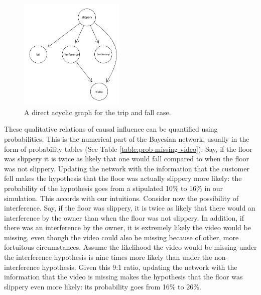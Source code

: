 \documentclass[
  10pt,
  dvipsnames,enabledeprecatedfontcommands]{scrartcl}
\begin{document}
\begin{figure}[t]
\includegraphics[width=5cm]{slippery-dag.png}
\caption{A direct acyclic graph for the trip and fall case.}
\label{fig:dag-missing-video}
\end{figure}

These qualitative relations of causal influence can be quantified using
probabilities. This is the numerical part of the Bayesian network,
usually in the form of probability tables (See Table
\ref{table:prob-missing-video}). Say, if the floor was slippery it is
twice as likely that one would fall compared to when the floor was not
slippery. Updating the network with the information that the customer
fell makes the hypothesis that the floor was actually slippery more
likely: the probability of the hypothesis goes from a stipulated 10\% to
16\% in our simulation. This accords with our intuitions. Consider now
the possibility of interference. Say, if the floor was slippery, it is
twice as likely that there would an interference by the owner than when
the floor was not slippery. In addition, if there was an interference by
the owner, it is extremely likely the video would be missing, even
though the video could also be missing because of other, more fortuitous
circumstances. Assume the likelihood the video would be missing under
the interference hypothesis is nine times more likely than under the
non-interference hypothesis. Given this 9:1 ratio, updating the network
with the information that the video is missing makes the hypothesis that
the floor was slippery even more likely: its probability goes from 16\%
to 26\%.
\end{document}
